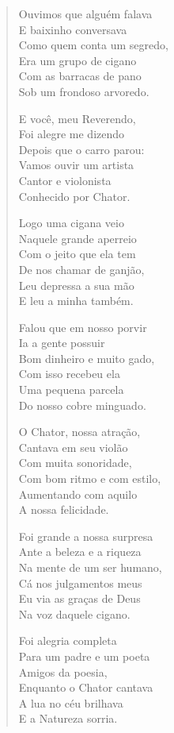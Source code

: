 \begin{verse}
Ouvimos que alguém falava\\
E baixinho conversava\\
Como quem conta um segredo,\\
Era um grupo de cigano\\
Com as barracas de pano\\
Sob um frondoso arvoredo.

E você, meu Reverendo,\\
Foi alegre me dizendo\\
Depois que o carro parou:\\
Vamos ouvir um artista\\
Cantor e violonista\\
Conhecido por Chator.

Logo uma cigana veio\\
Naquele grande aperreio\\
Com o jeito que ela tem\\
De nos chamar de ganjão,\\
Leu depressa a sua mão\\
E leu a minha também.

Falou que em nosso porvir\\
Ia a gente possuir\\
Bom dinheiro e muito gado,\\
Com isso recebeu ela\\
Uma pequena parcela\\
Do nosso cobre minguado.

O Chator, nossa atração,\\
Cantava em seu violão\\
Com muita sonoridade,\\
Com bom ritmo e com estilo,\\
Aumentando com aquilo\\
A nossa felicidade.

Foi grande a nossa surpresa\\
Ante a beleza e a riqueza\\
Na mente de um ser humano,\\
Cá nos julgamentos meus\\
Eu via as graças de Deus\\
Na voz daquele cigano.

Foi alegria completa\\
Para um padre e um poeta\\
Amigos da poesia,\\
Enquanto o Chator cantava\\
A lua no céu brilhava\\
E a Natureza sorria.


\end{verse}

